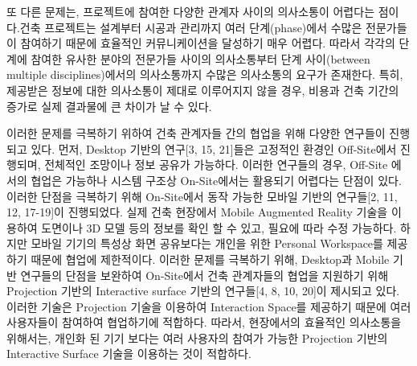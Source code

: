 또 다른 문제는, 프로젝트에 참여한 다양한 관계자 사이의 의사소통이 어렵다는 점이다\cite{ishii_augmented_2002,klein_imaged-based_2012,chi_development_2012,lin_using_2014}.건축 프로젝트는 설계부터 시공과 관리까지 여러 단계(phase)에서 수많은 전문가들이 참여하기 때문에 효율적인 커뮤니케이션을 달성하기 매우 어렵다. 따라서 각각의 단계에 참여한 유사한 분야의 전문가들 사이의 의사소통\cite{ishii_augmented_2002,chi_development_2012,song_penlight:_2009,lin_using_2014}부터 단계 사이(between multiple disciplines)에서의 의사소통\cite{machino_remote-collaboration_2006,wagner_building_2012,lin_using_2014}까지 수많은 의사소통의 요구가 존재한다. %
특히, 제공받은 정보에 대한 의사소통이 제대로 이루어지지 않을 경우, 비용과 건축 기간의 증가\cite{schall_handheld_2009}로 실제 결과물에 큰 차이가 날 수 있다. 

이러한 문제를 극복하기 위하여 건축 관계자들 간의 협업을 위해 다양한 연구들이 진행되고 있다. 먼저, Desktop 기반의 연구[3, 15, 21]들은 고정적인 환경인 Off-Site에서 진행되며, 전체적인 조망이나 정보 공유가 가능하다. 이러한 연구들의 경우, Off-Site 에서의 협업은 가능하나 시스템 구조상 On-Site에서는 활용되기 어렵다는 단점이 있다. 이러한 단점을 극복하기 위해 On-Site에서 동작 가능한 모바일 기반의 연구들[2, 11, 12, 17-19]이 진행되었다. 실제 건축 현장에서 Mobile Augmented Reality 기술을 이용하여 도면이나 3D 모델 등의 정보를 확인 할 수 있고, 필요에 따라 수정 가능하다. 하지만 모바일 기기의 특성상 화면 공유보다는 개인을 위한 Personal Workspace를 제공하기 때문에 협업에 제한적이다. 이러한 문제를 극복하기 위해, Desktop과  Mobile 기반 연구들의 단점을 보완하여 On-Site에서 건축 관계자들의 협업을 지원하기 위해 Projection 기반의 Interactive surface 기반의 연구들[4, 8, 10, 20]이 제시되고 있다. 이러한 기술은 Projection 기술을 이용하여 Interaction Space를 제공하기 때문에 여러 사용자들이 참여하여 협업하기에 적합하다. 따라서, 현장에서의 효율적인 의사소통을 위해서는, 개인화 된 기기 보다는 여러 사용자의 참여가 가능한 Projection 기반의 Interactive Surface 기술을 이용하는 것이 적합하다.


